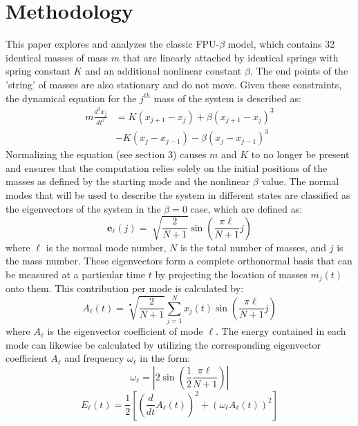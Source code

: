 \documentclass[twocolumn]{article}
\begin{document}
\section{Methodology}
\hspace{\parindent}This paper explores and analyzes the classic FPU-$\beta$ model, which contains 32 identical masses of mass $m$ that are linearly attached by identical springs with spring constant $K$ and an additional nonlinear constant $\beta$. The end points of the 'string' of masses are also stationary and do not move. Given these constraints, the dynamical equation for the $j^{th}$ mass of the system is described as:
\begin{equation}
\begin{split}
	m\frac{d^2x_j}{dt^2}&=K(x_{j+1}-x_j)+\beta(x_{j+1}-x_j)^3\\
	&-K(x_j-x_{j-1})-\beta(x_j-x_{j-1})^3
\end{split}
\end{equation}
Normalizing the equation (see section 3) causes $m$ and $K$ to no longer be present and ensures that the computation relies solely on the initial positions of the masses as defined by the starting mode and the nonlinear $\beta$ value. The normal modes that will be used to describe the system in different states are classified as the eigenvectors of the system in the $\beta=0$ case, which are defined as:
\begin{equation}
	\boldsymbol{e}_{\ell}(j)=\sqrt[]{\frac{2}{N+1}}\sin\left(\frac{\pi\ell}{N+1}j\right)
\end{equation}
where $\ell$ is the normal mode number, $N$ is the total number of masses, and $j$ is the mass number. These eigenvectors form a complete orthonormal basis that can be measured at a particular time $t$ by projecting the location of masses $m_j(t)$ onto them. This contribution per mode is calculated by:
\begin{equation}
	A_{\ell}(t)=\sqrt[•]{\frac{2}{N+1}}\sum_{j=1}^{N}x_j(t)\sin\left(\frac{\pi\ell}{N+1}j\right)
\end{equation}
where $A_{\ell}$ is the eigenvector coefficient of mode $\ell$. The energy contained in each mode can likewise be calculated by utilizing the corresponding eigenvector coefficient $A_{\ell}$ and frequency $\omega_{\ell}$ in the form:
\begin{equation}
	\omega_{\ell} = \left| 2\sin\left(\frac{1}{2}\frac{\pi\ell}{N+1}\right) \right|
\end{equation}
\begin{equation}
	E_{\ell}(t)=\frac{1}{2}\left[ \left(\frac{d}{dt}A_{\ell}(t)\right)^2+\left(\omega_{\ell}A_{\ell}(t)\right)^2 \right]
\end{equation}
\end{document}
